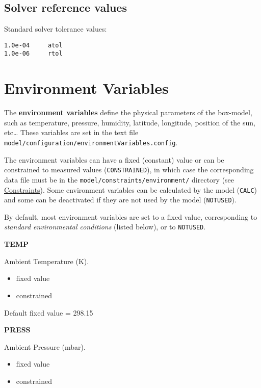\subsection{Solver reference values} \label{subsec:solver-reference-values}

Standard solver tolerance values:

\begin{verbatim}
1.0e-04     atol
1.0e-06     rtol
\end{verbatim}

\section{Environment Variables} \label{sec:envvar}

The \textbf{environment variables} define the physical parameters of
the box-model, such as temperature, pressure, humidity, latitude,
longitude, position of the sun, etc\ldots{} These variables are set in
the text file
\texttt{model/configuration/environmentVariables.config}.

The environment variables can have a fixed (constant) value or can be
constrained to measured values (\texttt{CONSTRAINED}), in which case
the corresponding data file must be in the
\texttt{model/constraints/environment/} directory (see
\hyperref[sec:constraints]{Constraints}). Some environment variables
can be calculated by the model (\texttt{CALC}) and some can be
deactivated if they are not used by the model (\texttt{NOTUSED}).

By default, most environment variables are set to a fixed value,
corresponding to \emph{standard environmental conditions} (listed
below), or to \texttt{NOTUSED}.

\textbf{TEMP}

Ambient Temperature (K).

\begin{itemize}
\item fixed value
\item constrained
\end{itemize}

Default fixed value = 298.15

\textbf{PRESS}

Ambient Pressure (mbar).

\begin{itemize}
\item fixed value
\item constrained
\end{itemize}

